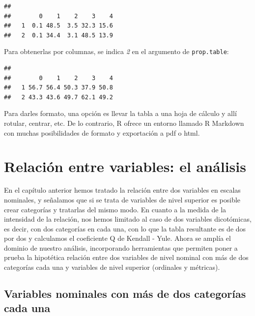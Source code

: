 \documentclass[]{book}
\newenvironment{Shaded}{\begin{snugshade}}{\end{snugshade}}
\newcommand{\DecValTok}[1]{\textcolor[rgb]{0.00,0.00,0.81}{#1}}
\newcommand{\FloatTok}[1]{\textcolor[rgb]{0.00,0.00,0.81}{#1}}
\newcommand{\KeywordTok}[1]{\textcolor[rgb]{0.13,0.29,0.53}{\textbf{#1}}}
\newcommand{\NormalTok}[1]{#1}
\newcommand{\OperatorTok}[1]{\textcolor[rgb]{0.81,0.36,0.00}{\textbf{#1}}}
\newcommand{\StringTok}[1]{\textcolor[rgb]{0.31,0.60,0.02}{#1}}
\begin{document}
\begin{verbatim}
##    
##        0    1    2    3    4
##   1  0.1 48.5  3.5 32.3 15.6
##   2  0.1 34.4  3.1 48.5 13.9
\end{verbatim}

Para obtenerlas por columnas, se indica \emph{2} en el argumento de \texttt{prop.table}:

\begin{Shaded}
\end{Shaded}

\begin{verbatim}
##    
##        0    1    2    3    4
##   1 56.7 56.4 50.3 37.9 50.8
##   2 43.3 43.6 49.7 62.1 49.2
\end{verbatim}

Para darles formato, una opción es llevar la tabla a una hoja de cálculo y allí rotular, centrar, etc. De lo contrario, R ofrece un entorno llamado R Markdown con muchas posibilidades de formato y exportación a pdf o html.

\hypertarget{relacion-entre-variables-el-analisis}{%
\chapter{Relación entre variables: el análisis}\label{relacion-entre-variables-el-analisis}}

En el capítulo anterior hemos tratado la relación entre dos variables en
escalas nominales, y señalamos que si se trata de variables de nivel
superior es posible crear categorías y tratarlas del mismo modo. En
cuanto a la medida de la intensidad de la relación, nos hemos limitado
al caso de dos variables dicotómicas, es decir, con dos categorías en
cada una, con lo que la tabla resultante es de dos por dos y calculamos
el coeficiente Q de Kendall - Yule. Ahora se amplía el dominio de
nuestro análisis, incorporando herramientas que permiten poner a prueba
la hipotética relación entre dos variables de nivel nominal con más de
dos categorías cada una y variables de nivel superior (ordinales y
métricas).

\hypertarget{variables-nominales-con-mas-de-dos-categorias-cada-una}{%
\section{Variables nominales con más de dos categorías cada una}\label{variables-nominales-con-mas-de-dos-categorias-cada-una}}
\end{document}
